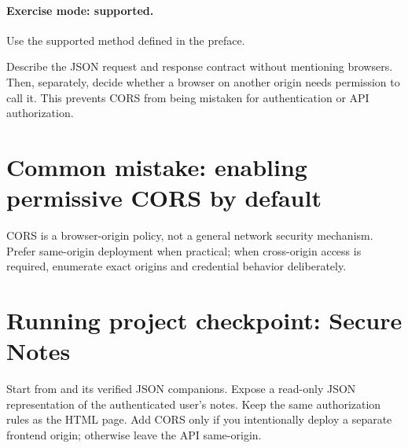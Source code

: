 \paragraph{Exercise mode: supported.} Use the supported method defined in the preface.

Describe the JSON request and response contract without mentioning browsers. Then, separately, decide whether a browser on another origin needs permission to call it. This prevents CORS from being mistaken for authentication or API authorization.

\section{Common mistake: enabling permissive CORS by default}
CORS is a browser-origin policy, not a general network security mechanism. Prefer same-origin deployment when practical; when cross-origin access is required, enumerate exact origins and credential behavior deliberately.

\section{Running project checkpoint: Secure Notes}
Start from  and its verified JSON companions. Expose a read-only JSON representation of the authenticated user's notes. Keep the same authorization rules as the HTML page. Add CORS only if you intentionally deploy a separate frontend origin; otherwise leave the API same-origin.
